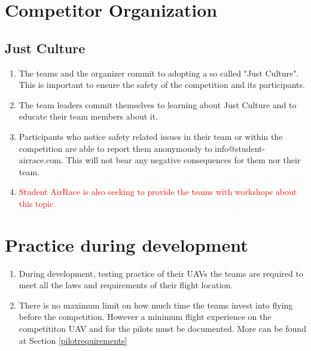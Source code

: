     \section{Competitor Organization}

    \subsection{Just Culture}
    \begin{enumerate}
      \item The teams and the organizer commit to adopting a so called "Just Culture". This is important to ensure the safety of the competition and its participants.
      \item The team leaders commit themselves to learning about Just Culture and to educate their team members about it.
      \item Participants who notice safety related issues in their team or within the competition are able to report them anonymously  to info@student-airrace.com. This will not bear any
      negative consequences for them nor their team. 
      \item \textcolor{red}{Student AirRace is also seeking to provide the teams with workshops about this topic.}
    \end{enumerate}

    \section{Practice during development}
    \begin{enumerate}
      \item During development, testing practice of their UAVs the teams are required to meet all the laws and requirements of their flight location. 
      \item There is no maximum limit on how much time the teams invest into flying before the competition. However a minimum flight experience on the competititon UAV and for the pilots must be documented. More can be found at Section \ref{pilotrequirements}
    \end{enumerate}

